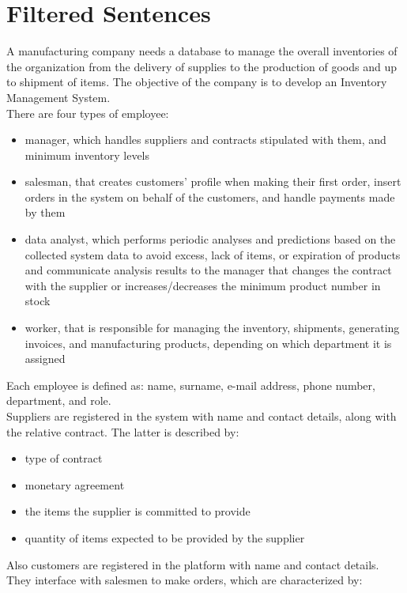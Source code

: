 \section{Filtered Sentences}

A manufacturing company needs a database to manage the overall inventories of the organization from the delivery of supplies to the production of goods and up to shipment of items. The objective of the company is to develop an Inventory Management System.\\
There are four types of employee:
\begin{itemize}
	\item manager, which handles suppliers and contracts stipulated with them, and minimum inventory levels
	\item salesman, that creates customers' profile when making their first order, insert orders in the system on behalf of the customers, and handle payments made by them
	\item data analyst, which performs periodic analyses and predictions based on the collected system data to avoid excess, lack of items, or expiration of products and communicate analysis results to the manager that changes the contract with the supplier or increases/decreases the minimum product number in stock
	\item worker, that is responsible for managing the inventory, shipments, generating invoices, and manufacturing products, depending on which department it is assigned
\end{itemize}
Each employee is defined as: name, surname, e-mail address, phone number, department, and role.\\
Suppliers are registered in the system with name and contact details, along with the relative contract. The latter is described by:
\begin{itemize}
	\item type of contract %
	\item monetary agreement
	\item the items the supplier is committed to provide
	\item quantity of items expected to be provided by the supplier
\end{itemize}
Also customers are registered in the platform with name and contact details. They interface with salesmen to make orders, which are characterized by:

